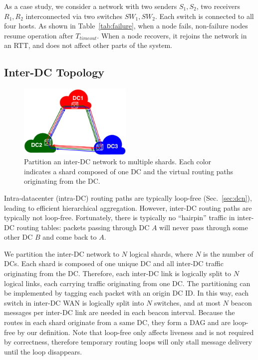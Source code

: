 {As a case study, we consider a network with two senders $S_1, S_2$, two receivers $R_1, R_2$ interconnected via two switches $SW_1, SW_2$.
Each switch is connected to all four hosts.
As shown in Table~\ref{tab:failure}, when a node fails, non-failure nodes resume operation after $T_{timeout}$. When a node recovers, it rejoins the network in an RTT, and does not affect other parts of the system.

\fi





\iffalse
\subsection{Inter-DC Topology}
\label{sec:inter-dc}


\begin{figure}[t]
\centering
\includegraphics[width=0.48\textwidth]{images/inter-DC.pdf}
\caption{
	Partition an inter-DC network to multiple shards.
	Each color indicates a shard composed of one DC and the virtual routing paths originating from the DC.
}
\label{fig:inter-dc}
\end{figure}



Intra-datacenter (intra-DC) routing paths are typically loop-free (Sec.~\ref{sec:dcn}), leading to efficient hierarchical aggregation.
However, inter-DC routing paths are typically not loop-free.
Fortunately, there is typically no ``hairpin'' traffic in inter-DC routing tables: packets passing through DC $A$ will never pass through some other DC $B$ and come back to $A$.

We partition the inter-DC network to $N$ logical shards, where $N$ is the number of DCs.
Each shard is composed of one unique DC and all inter-DC traffic originating from the DC.
Therefore, each inter-DC link is logically split to $N$ logical links, each carrying traffic originating from one DC.
The partitioning can be implemented by tagging each packet with an origin DC ID.
In this way, each switch in inter-DC WAN is logically split into $N$ switches, and at most $N$ beacon messages per inter-DC link are needed in each beacon interval.
Because the routes in each shard originate from a same DC, they form a DAG and are loop-free by our definition.
Note that loop-free only affects liveness and is not required by correctness, therefore temporary routing loops will only stall message delivery until the loop disappears.

}
